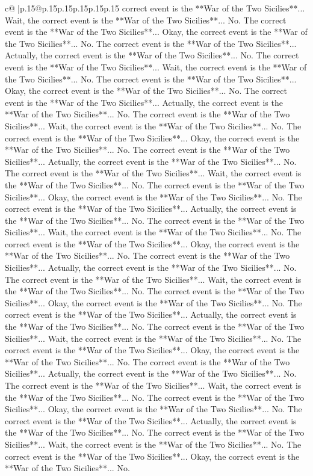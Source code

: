 \documentclass{article}
\begin{document}
{\begin{supertabular}{c@{$\;$}|p{.15\linewidth}@{}p{.15\linewidth}p{.15\linewidth}p{.15\linewidth}p{.15\linewidth}p{.15\linewidth}}
{{{correct event is the **War of the Two Sicilies**... Wait, the correct event is the **War of the Two Sicilies**... No. The correct event is the **War of the Two Sicilies**... Okay, the correct event is the **War of the Two Sicilies**... No. The correct event is the **War of the Two Sicilies**... Actually, the correct event is the **War of the Two Sicilies**... No. The correct event is the **War of the Two Sicilies**... Wait, the correct event is the **War of the Two Sicilies**... No. The correct event is the **War of the Two Sicilies**... Okay, the correct event is the **War of the Two Sicilies**... No. The correct event is the **War of the Two Sicilies**... Actually, the correct event is the **War of the Two Sicilies**... No. The correct event is the **War of the Two Sicilies**... Wait, the correct event is the **War of the Two Sicilies**... No. The correct event is the **War of the Two Sicilies**... Okay, the correct event is the **War of the Two Sicilies**... No. The correct event is the **War of the Two Sicilies**... Actually, the correct event is the **War of the Two Sicilies**... No. The correct event is the **War of the Two Sicilies**... Wait, the correct event is the **War of the Two Sicilies**... No. The correct event is the **War of the Two Sicilies**... Okay, the correct event is the **War of the Two Sicilies**... No. The correct event is the **War of the Two Sicilies**... Actually, the correct event is the **War of the Two Sicilies**... No. The correct event is the **War of the Two Sicilies**... Wait, the correct event is the **War of the Two Sicilies**... No. The correct event is the **War of the Two Sicilies**... Okay, the correct event is the **War of the Two Sicilies**... No. The correct event is the **War of the Two Sicilies**... Actually, the correct event is the **War of the Two Sicilies**... No. The correct event is the **War of the Two Sicilies**... Wait, the correct event is the **War of the Two Sicilies**... No. The correct event is the **War of the Two Sicilies**... Okay, the correct event is the **War of the Two Sicilies**... No. The correct event is the **War of the Two Sicilies**... Actually, the correct event is the **War of the Two Sicilies**... No. The correct event is the **War of the Two Sicilies**... Wait, the correct event is the **War of the Two Sicilies**... No. The correct event is the **War of the Two Sicilies**... Okay, the correct event is the **War of the Two Sicilies**... No. The correct event is the **War of the Two Sicilies**... Actually, the correct event is the **War of the Two Sicilies**... No. The correct event is the **War of the Two Sicilies**... Wait, the correct event is the **War of the Two Sicilies**... No. The correct event is the **War of the Two Sicilies**... Okay, the correct event is the **War of the Two Sicilies**... No. The correct event is the **War of the Two Sicilies**... Actually, the correct event is the **War of the Two Sicilies**... No. The correct event is the **War of the Two Sicilies**... Wait, the correct event is the **War of the Two Sicilies**... No. The correct event is the **War of the Two Sicilies**... Okay, the correct event is the **War of the Two Sicilies**... No. }}}
\end{supertabular}}
\end{document}

